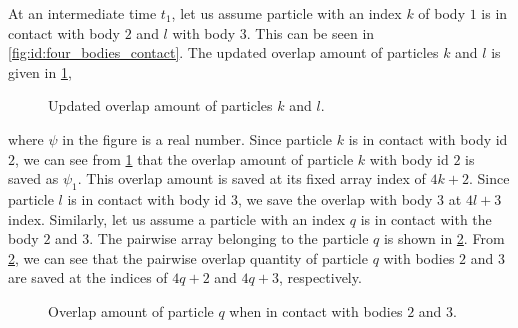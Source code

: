 At an intermediate time $t_1$, let us assume particle with an index $k$ of body
$1$ is in contact with body $2$ and $l$ with body $3$. This can be seen in
\cref{fig:id:four_bodies_contact}. The updated overlap amount of particles $k$
and $l$ is given in \cref{fig:id:k_f_overlap_t_1},
\begin{figure}[!htpb]
  \centering
  \footnotesize
  \caption{Updated overlap amount of particles $k$ and $l$.}
\label{fig:id:k_f_overlap_t_1}
\end{figure}
where $\psi$ in the figure is a real number. Since particle $k$ is in contact
with body id $2$, we can see from \cref{fig:id:k_f_overlap_t_1} that the overlap
amount of particle $k$ with body id $2$ is saved as $\psi_1$. This overlap
amount is saved at its fixed array index of $4k+2$. Since particle $l$ is in
contact with body id $3$, we save the overlap with body $3$ at $4l+3$ index.
Similarly, let us assume a particle with an index $q$ is in contact with the
body $2$ and $3$. The pairwise array belonging to the particle $q$ is shown in
\cref{fig:id:overlap_of_q_at_t_1}. From \cref{fig:id:overlap_of_q_at_t_1}, we
can see that the pairwise overlap quantity of particle $q$ with bodies $2$ and
$3$ are saved at the indices of $4q+2$ and $4q+3$, respectively.
\begin{figure}[!htpb]
  \centering
  \footnotesize
  \caption{Overlap amount of particle $q$ when in contact with bodies $2$ and $3$.}
  \label{fig:id:overlap_of_q_at_t_1}
\end{figure}

